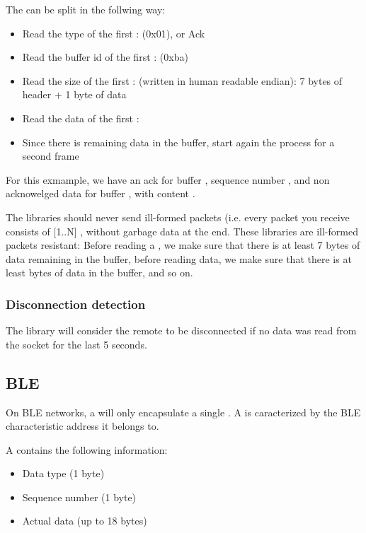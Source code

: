 The   can be split in the follwing way:\
\begin{itemize}
\item{Read the type of the first : \ARCode(0x01), or Ack}
\item{Read the buffer id of the first : \ARCode(0xba)}
\item{Read the size of the first : \ARCode{0x00000008} (written in human readable endian): 7 bytes of header + 1 byte of data}
\item{Read the data of the first \ARCode{frame}: \ARCode{0x42}}
\item{Since there is remaining data in the buffer, start again the process for a second frame}
\end{itemize}

For this exmample, we have an ack for buffer , sequence number , and non acknowelged data for buffer , with content .


The  libraries should never send ill-formed packets (i.e. every packet you receive consists of [1..N] , without garbage data at the end. These libraries are ill-formed packets resistant: Before reading a , we make sure that there is at least 7 bytes of data remaining in the buffer, before reading data, we make sure that there is at least  bytes of data in the buffer, and so on.

\subsubsection{Disconnection detection}

The  library will consider the remote to be disconnected if no data was read from the socket for the last 5 seconds.

\subsection{BLE}

On BLE networks, a  will only encapsulate a single . A  is caracterized by the BLE characteristic address it belongs to.


A  contains the following information:
\begin{itemize}
\item{Data type (1 byte)}
\item{Sequence number (1 byte)}
\item{Actual data (up to 18 bytes)}
\end{itemize}

